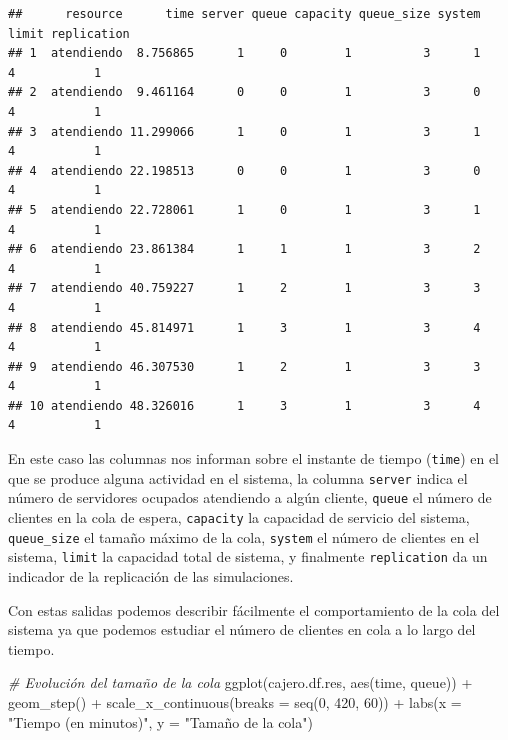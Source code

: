 \documentclass[
]{book}
\newenvironment{Shaded}{\begin{snugshade}}{\end{snugshade}}
\newcommand{\AttributeTok}[1]{\textcolor[rgb]{0.77,0.63,0.00}{#1}}
\newcommand{\CommentTok}[1]{\textcolor[rgb]{0.56,0.35,0.01}{\textit{#1}}}
\newcommand{\DecValTok}[1]{\textcolor[rgb]{0.00,0.00,0.81}{#1}}
\newcommand{\FunctionTok}[1]{\textcolor[rgb]{0.00,0.00,0.00}{#1}}
\newcommand{\NormalTok}[1]{#1}
\newcommand{\SpecialCharTok}[1]{\textcolor[rgb]{0.00,0.00,0.00}{#1}}
\newcommand{\StringTok}[1]{\textcolor[rgb]{0.31,0.60,0.02}{#1}}
\theoremstyle{definition}
\theoremstyle{definition}
\theoremstyle{definition}
\theoremstyle{definition}
\theoremstyle{remark}
\begin{document}
\begin{verbatim}
##      resource      time server queue capacity queue_size system limit replication
## 1  atendiendo  8.756865      1     0        1          3      1     4           1
## 2  atendiendo  9.461164      0     0        1          3      0     4           1
## 3  atendiendo 11.299066      1     0        1          3      1     4           1
## 4  atendiendo 22.198513      0     0        1          3      0     4           1
## 5  atendiendo 22.728061      1     0        1          3      1     4           1
## 6  atendiendo 23.861384      1     1        1          3      2     4           1
## 7  atendiendo 40.759227      1     2        1          3      3     4           1
## 8  atendiendo 45.814971      1     3        1          3      4     4           1
## 9  atendiendo 46.307530      1     2        1          3      3     4           1
## 10 atendiendo 48.326016      1     3        1          3      4     4           1
\end{verbatim}

En este caso las columnas nos informan sobre el instante de tiempo (\texttt{time}) en el que se produce alguna actividad en el sistema, la columna \texttt{server} indica el número de servidores ocupados atendiendo a algún cliente, \texttt{queue} el número de clientes en la cola de espera, \texttt{capacity} la capacidad de servicio del sistema, \texttt{queue\_size} el tamaño máximo de la cola, \texttt{system} el número de clientes en el sistema, \texttt{limit} la capacidad total de sistema, y finalmente \texttt{replication} da un indicador de la replicación de las simulaciones.

Con estas salidas podemos describir fácilmente el comportamiento de la cola del sistema ya que podemos estudiar el número de clientes en cola a lo largo del tiempo.

\begin{Shaded}
\begin{Highlighting}[]
\CommentTok{\# Evolución del tamaño de la cola}
\FunctionTok{ggplot}\NormalTok{(cajero.df.res, }\FunctionTok{aes}\NormalTok{(time, queue)) }\SpecialCharTok{+}
  \FunctionTok{geom\_step}\NormalTok{() }\SpecialCharTok{+}
  \FunctionTok{scale\_x\_continuous}\NormalTok{(}\AttributeTok{breaks =} \FunctionTok{seq}\NormalTok{(}\DecValTok{0}\NormalTok{, }\DecValTok{420}\NormalTok{, }\DecValTok{60}\NormalTok{)) }\SpecialCharTok{+} 
  \FunctionTok{labs}\NormalTok{(}\AttributeTok{x =} \StringTok{"Tiempo (en minutos)"}\NormalTok{, }\AttributeTok{y =} \StringTok{"Tamaño de la cola"}\NormalTok{)}
\end{Highlighting}
\end{Shaded}
\end{document}
